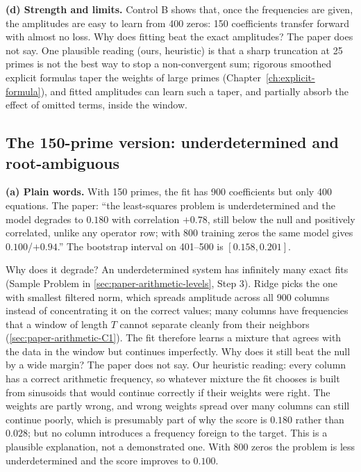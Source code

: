 \textbf{(d) Strength and limits.} Control B shows that, once the frequencies are given, the amplitudes are easy to learn from 400 zeros: 150 coefficients transfer forward with almost no loss. Why does fitting beat the exact amplitudes? The paper does not say. One plausible reading (ours, heuristic) is that a sharp truncation at 25 primes is not the best way to stop a non-convergent sum; rigorous smoothed explicit formulas taper the weights of large primes (Chapter~\ref{ch:explicit-formula}), and fitted amplitudes can learn such a taper, and partially absorb the effect of omitted terms, inside the window.

\subsection{The 150-prime version: underdetermined and root-ambiguous}

\textbf{(a) Plain words.} With 150 primes, the fit has 900 coefficients but only 400 equations. The paper: ``the least-squares problem is underdetermined and the model degrades to $0.180$ with correlation $+0.78$, still below the null and positively correlated, unlike any operator row; with 800 training zeros the same model gives $0.100$/$+0.94$.'' The bootstrap interval on 401--500 is $[0.158, 0.201]$.

Why does it degrade? An underdetermined system has infinitely many exact fits (Sample Problem in \cref{sec:paper-arithmetic-levels}, Step 3). Ridge picks the one with smallest filtered norm, which spreads amplitude across all 900 columns instead of concentrating it on the correct values; many columns have frequencies that a window of length $T$ cannot separate cleanly from their neighbors (\cref{sec:paper-arithmetic-C1}). The fit therefore learns a mixture that agrees with the data in the window but continues imperfectly. Why does it still beat the null by a wide margin? The paper does not say. Our heuristic reading: every column has a correct arithmetic frequency, so whatever mixture the fit chooses is built from sinusoids that would continue correctly if their weights were right. The weights are partly wrong, and wrong weights spread over many columns can still continue poorly, which is presumably part of why the score is $0.180$ rather than $0.028$; but no column introduces a frequency foreign to the target. This is a plausible explanation, not a demonstrated one. With 800 zeros the problem is less underdetermined and the score improves to $0.100$.

